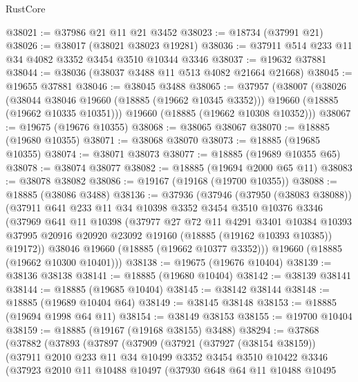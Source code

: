 \begin{lexlean}{RustCore}
\begin{coremodule}
@38021 := @37986 @21 @11 @21 @3452
@38023 := @18734 (@37991 @21)
@38026 := @38017 (@38021 @38023 @19281)
@38036 := @37911 @514 @233 @11 @34 @4082 @3352 @3454 @3510 @10344 @3346
@38037 := @19632 @37881
@38044 := @38036 (@38037 @3488 @11 @513 @4082 @21664 @21668)
@38045 := @19655 @37881
@38046 := @38045 @3488
@38065 := @37957
    (@38007
      (@38026
        (@38044 @38046 @19660 (@18885 (@19662 @10345 @3352)))
        @19660
        (@18885 (@19662 @10335 @10351)))
      @19660
      (@18885 (@19662 @10308 @10352)))
@38067 := @19675 (@19676 @10355)
@38068 := @38065 @38067
@38070 := @18885 (@19680 @10355)
@38071 := @38068 @38070
@38073 := @18885 (@19685 @10355)
@38074 := @38071 @38073
@38077 := @18885 (@19689 @10355 @65)
@38078 := @38074 @38077
@38082 := @18885 (@19694 @2000 @65 @11)
@38083 := @38078 @38082
@38086 := @19167 (@19168 (@19700 @10355))
@38088 := @18885 (@38086 @3488)
@38136 := @37936
    (@37946
      (@37950 (@38083 @38088))
      (@37911
        @641
        @233
        @11
        @34
        @10398
        @3352
        @3454
        @3510
        @10376
        @3346
        (@37969
          @641
          @11
          @10398
          (@37977
            @27
            @72
            @11
            @4291
            @3401
            @10384
            @10393
            @37995
            @20916
            @20920
            @23092
            @19160
            (@18885 (@19162 @10393 @10385))
            @19172))
        @38046
        @19660
        (@18885 (@19662 @10377 @3352)))
      @19660
      (@18885 (@19662 @10300 @10401)))
@38138 := @19675 (@19676 @10404)
@38139 := @38136 @38138
@38141 := @18885 (@19680 @10404)
@38142 := @38139 @38141
@38144 := @18885 (@19685 @10404)
@38145 := @38142 @38144
@38148 := @18885 (@19689 @10404 @64)
@38149 := @38145 @38148
@38153 := @18885 (@19694 @1998 @64 @11)
@38154 := @38149 @38153
@38155 := @19700 @10404
@38159 := @18885 (@19167 (@19168 @38155) @3488)
@38294 := @37868
    (@37882
      (@37893
        (@37897
          (@37909
            (@37921
              (@37927 (@38154 @38159))
              (@37911
                @2010
                @233
                @11
                @34
                @10499
                @3352
                @3454
                @3510
                @10422
                @3346
                (@37923
                  @2010
                  @11
                  @10488
                  @10497
                  (@37930
                    @648
                    @64
                    @11
                    @10488
                    @10495

\end{coremodule}
\end{lexlean}
